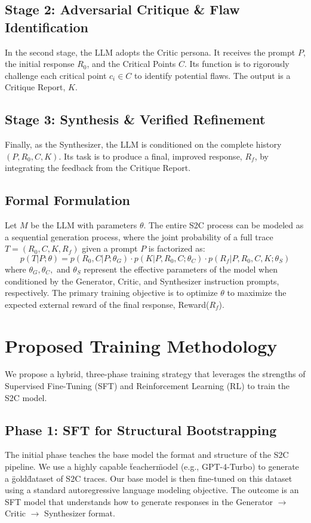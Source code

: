 \documentclass[conference]{IEEEtran}
\begin{document}
\subsection{Stage 2: Adversarial Critique \& Flaw Identification}
In the second stage, the LLM adopts the Critic persona. It receives the prompt $P$, the initial response $R_0$, and the Critical Points $C$. Its function is to rigorously challenge each critical point $c_i \in C$ to identify potential flaws. The output is a Critique Report, $K$.

\subsection{Stage 3: Synthesis \& Verified Refinement}
Finally, as the Synthesizer, the LLM is conditioned on the complete history $(P, R_0, C, K)$. Its task is to produce a final, improved response, $R_f$, by integrating the feedback from the Critique Report.

\subsection{Formal Formulation}
Let $M$ be the LLM with parameters $\theta$. The entire S2C process can be modeled as a sequential generation process, where the joint probability of a full trace $T = (R_0, C, K, R_f)$ given a prompt $P$ is factorized as:
\begin{equation}
    p(T|P; \theta) = p(R_0, C|P;\theta_G) \cdot p(K|P, R_0, C; \theta_C) \cdot p(R_f|P, R_0, C, K; \theta_S)
    \label{eq:factorization}
\end{equation}
where $\theta_G, \theta_C,$ and $\theta_S$ represent the effective parameters of the model when conditioned by the Generator, Critic, and Synthesizer instruction prompts, respectively. The primary training objective is to optimize $\theta$ to maximize the expected external reward of the final response, Reward($R_f$). 

\section{Proposed Training Methodology}
We propose a hybrid, three-phase training strategy that leverages the strengths of Supervised Fine-Tuning (SFT) and Reinforcement Learning (RL) to train the S2C model.

\subsection{Phase 1: SFT for Structural Bootstrapping}
The initial phase teaches the base model the format and structure of the S2C pipeline. We use a highly capable \"teacher\" model (e.g., GPT-4-Turbo) to generate a \"gold\" dataset of S2C traces. Our base model is then fine-tuned on this dataset using a standard autoregressive language modeling objective. The outcome is an SFT model that understands how to generate responses in the Generator $\rightarrow$ Critic $\rightarrow$ Synthesizer format.
\end{document}
